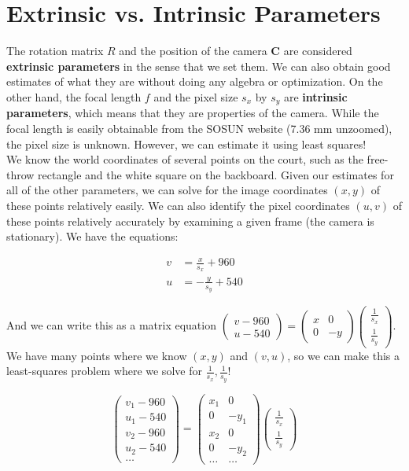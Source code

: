 \documentclass{article}
\begin{document}
\section{Extrinsic vs. Intrinsic Parameters}
The rotation matrix $R$ and the position of the camera $\bm{C}$ are considered \textbf{extrinsic parameters} in the sense that we set them. We can also obtain good estimates of what they are without doing any algebra or optimization. On the other hand, the focal length $f$ and the pixel size $s_{x}$ by $s_{y}$ are \textbf{intrinsic parameters}, which means that they are properties of the camera. While the focal length is easily obtainable from the SOSUN website (7.36 mm unzoomed), the pixel size is unknown. However, we can estimate it using least squares! \\

We know the world coordinates of several points on the court, such as the free-throw rectangle and the white square on the backboard. Given our estimates for all of the other parameters, we can solve for the image coordinates $(x, y)$ of these points relatively easily. We can also identify the pixel coordinates $(u, v)$ of these points relatively accurately by examining a given frame (the camera is stationary). We have the equations:

\begin{align*}
v&=\frac{x}{s_{x}}+960 \\
u&=-\frac{y}{s_{y}}+540
\end{align*}

And we can write this as a matrix equation $\begin{pmatrix} v-960 \\ u-540 \end{pmatrix}=\begin{pmatrix} x & 0 \\ 0 & -y \end{pmatrix}\begin{pmatrix} \frac{1}{s_x} \\ \frac{1}{s_y} \end{pmatrix}$. We have many points where we know $(x, y)$ and $(v, u)$, so we can make this a least-squares problem where we solve for $\frac{1}{s_x}, \frac{1}{s_y}$!

\[\begin{pmatrix} v_1-960 \\ u_1-540 \\ v_2-960 \\ u_2-540 \\ \hdots \end{pmatrix}=\begin{pmatrix} x_1 & 0 \\ 0 & -y_1 \\ x_2 & 0 \\ 0 & -y_2 \\ \hdots & \hdots \end{pmatrix}\begin{pmatrix} \frac{1}{s_x} \\ \frac{1}{s_y} \end{pmatrix}\]
\end{document}

